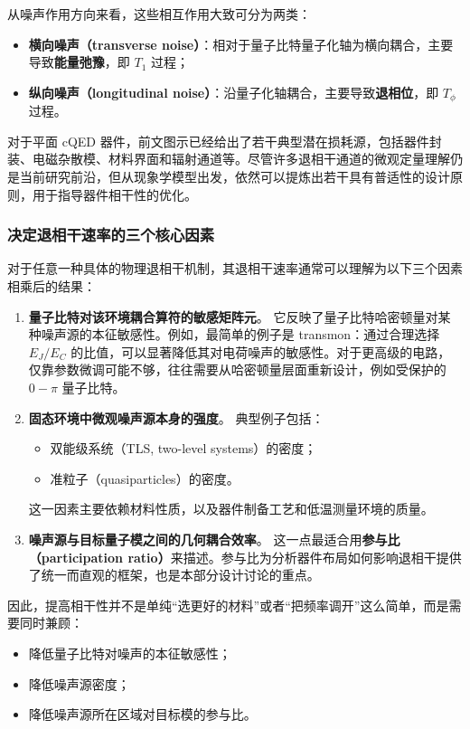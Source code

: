 \documentclass[12pt,a4paper,oneside]{ctexbook}
\begin{document}
从噪声作用方向来看，这些相互作用大致可分为两类：
\begin{itemize}
    \item \textbf{横向噪声（transverse noise）}：相对于量子比特量子化轴为横向耦合，主要导致\textbf{能量弛豫}，即 \(T_1\) 过程；
    \item \textbf{纵向噪声（longitudinal noise）}：沿量子化轴耦合，主要导致\textbf{退相位}，即 \(T_\phi\) 过程。
\end{itemize}

对于平面 cQED 器件，前文图示已经给出了若干典型潜在损耗源，包括器件封装、电磁杂散模、材料界面和辐射通道等。尽管许多退相干通道的微观定量理解仍是当前研究前沿，但从现象学模型出发，依然可以提炼出若干具有普适性的设计原则，用于指导器件相干性的优化。

\subsubsection{决定退相干速率的三个核心因素}

对于任意一种具体的物理退相干机制，其退相干速率通常可以理解为以下三个因素相乘后的结果：

\begin{enumerate}
    \item \textbf{量子比特对该环境耦合算符的敏感矩阵元}。  
    它反映了量子比特哈密顿量对某种噪声源的本征敏感性。例如，最简单的例子是 transmon：通过合理选择 \(E_J/E_C\) 的比值，可以显著降低其对电荷噪声的敏感性。对于更高级的电路，仅靠参数微调可能不够，往往需要从哈密顿量层面重新设计，例如受保护的 \(0\!-\!\pi\) 量子比特。

    \item \textbf{固态环境中微观噪声源本身的强度}。  
    典型例子包括：
    \begin{itemize}
        \item 双能级系统（TLS, two-level systems）的密度；
        \item 准粒子（quasiparticles）的密度。
    \end{itemize}
    这一因素主要依赖材料性质，以及器件制备工艺和低温测量环境的质量。

    \item \textbf{噪声源与目标量子模之间的几何耦合效率}。  
    这一点最适合用\textbf{参与比（participation ratio）}来描述。参与比为分析器件布局如何影响退相干提供了统一而直观的框架，也是本部分设计讨论的重点。
\end{enumerate}

因此，提高相干性并不是单纯“选更好的材料”或者“把频率调开”这么简单，而是需要同时兼顾：
\begin{itemize}
    \item 降低量子比特对噪声的本征敏感性；
    \item 降低噪声源密度；
    \item 降低噪声源所在区域对目标模的参与比。
\end{itemize}
\end{document}
